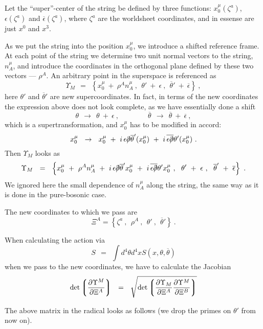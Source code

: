 \documentclass[12pt]{article}
\newcommand{\p}{\partial}
\newcommand{\ov}{\overline}
\def\slashed#1{\setbox0=\hbox{$#1$}             %
   \dimen0=\wd0                                 %
   \setbox1=\hbox{/} \dimen1=\wd1               %
   \ifdim\dimen0>\dimen1                        %
      \rlap{\hbox to \dimen0{\hfil/\hfil}}      %
      #1                                        %
   \else                                        %
      \rlap{\hbox to \dimen1{\hfil$#1$\hfil}}   %
      /                                         %
   \fi}                                        %
\begin{document}
    Let the ``super''-center of the string be defined by three functions: $ x_0^\mu(\zeta^a) $, $ \epsilon(\zeta^a) $
and $\ov\epsilon(\zeta^a)$, where $ \zeta^a $ are the worldsheet coordinates, and in essense are just $ x^0 $ and $ x^3 $.

    As we put the string into the position $ x_0^\mu $, we introduce a shifted reference frame. At each point of the string
we determine two unit normal vectors to the string, $ n^\mu_A $, and introduce the coordinates in the orthogonal plane defined
by these two vectors --- $ \rho^A $.
An arbitrary point in the superspace is referenced as
\[
	\Upsilon_M ~~=~~ \left\{ x_0^\mu ~+~ \rho^A n^\mu_A~,~~ \theta' ~+~ \epsilon~,~~ \ov{\theta}' ~+~ \ov{\epsilon} \right \}~,
\]
here $ \theta' $ and $ \ov{\theta}' $ are new supercoordinates.
In fact, in terms of the new coordinates the expression above does not look complete, as we have essentially done a shift
\[
	\theta ~~\to~~ \theta ~+~ \epsilon ~, \qquad\qquad \ov{\theta} ~~\to~~ \ov{\theta} ~+~ \ov{\epsilon}~,
\]
which is a supertransformation, and $ x_0^\mu $ has to be modified in accord:
\[
    x_0^\mu ~~\to~~ x_0^\mu ~+~ i\, \epsilon\slashed{\p}\ov{\theta}'(x_0^\mu) ~+~ i\, \ov{\epsilon\slashed{\p}}\theta'(x_0^\mu)~.
\]
Then $ \Upsilon_M $ looks as 
\[
	\Upsilon_M ~~=~~ \left\{ x_0^\mu ~+~ \rho^A n^\mu_A ~+~ i\, \epsilon\slashed{\p}\ov{\theta}' x_0^\mu ~+~ 
								i\, \ov{\epsilon\slashed{\p}}\theta' x_0^\mu~,
	~~ \theta' ~+~ \epsilon~,~~ \ov{\theta}' ~+~ \ov{\epsilon} \right \}~.
\]
We ignored here the small dependence of $ n_A^\mu $ along the string, the same way as it is done in the pure-bosonic case.

The new coordinates to which we pass are
\[
	\Xi^A =  \left\{  \zeta^a ~,~~ \rho^A ~,~~ \theta' ~,~~ \ov{\theta}' \right \}~.
\]

When calculating the action via
\[
	S ~~=~~ \int d^4\theta d^4x S(x,\theta,\ov{\theta})
\]
when we pass to the new coordinates, we have to calculate the Jacobian
\[
	\det \left\lgroup \frac{\p \Upsilon^M}{\p\Xi^A} \right\rgroup ~~=~~
		\sqrt{ \det \left\lgroup \frac {\p\Upsilon_M}{\p\Xi^A} \frac{\p\Upsilon^M}{\p\Xi^B} \right\rgroup }
\]


\newpage
The above matrix in the radical looks as follows
(we drop the primes on $ \theta' $ from now on).
\end{document}
